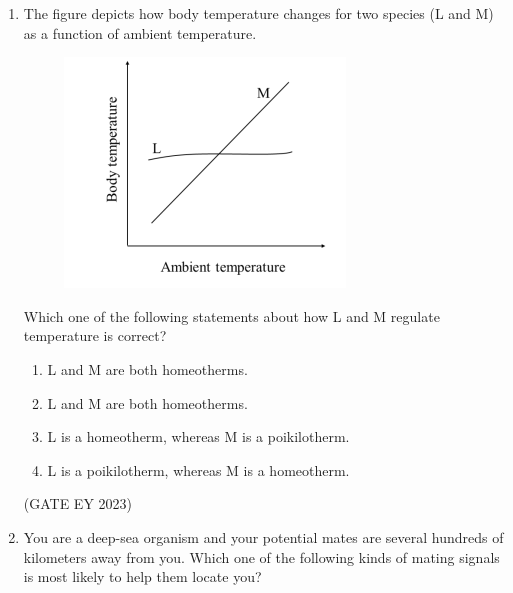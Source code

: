\documentclass[journal,12pt,onecolumn]{IEEEtran}
\theoremstyle{remark}
\begin{document}
\begin{enumerate}
\begin{enumerate}
\begin{multicols}{2}
\end{multicols}
\end{enumerate}

\hfill{(GATE EY 2023)}

 \item The figure depicts how body temperature changes for two species (L and M) as a
function of ambient temperature. 

\begin{figure}[H]
    \centering
    \includegraphics[]{figs/Q.16.png}
    \caption{}
    \label{fig:3}
\end{figure}
Which one of the following statements about how L and M regulate temperature is
correct?
\begin{enumerate}

\item L and M are both homeotherms.
\item L and M are both homeotherms.
\item L is a homeotherm, whereas M is a poikilotherm.
\item L is a poikilotherm, whereas M is a homeotherm.


\end{enumerate}

\hfill{(GATE EY 2023)}
 \item You are a deep-sea organism and your potential mates are several hundreds of
kilometers away from you. Which one of the following kinds of mating signals is
most likely to help them locate you?
\begin{enumerate}
\end{enumerate}



\end{enumerate}
\end{document}
